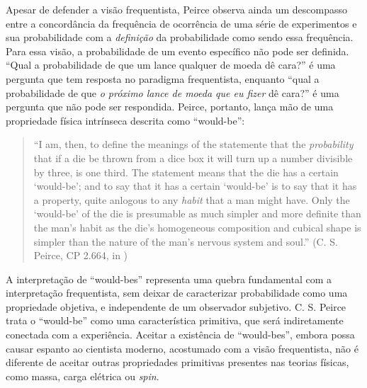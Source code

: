 Apesar de defender a visão frequentista, 
Peirce observa ainda um descompasso entre a concordância da frequência de ocorrência
de uma série de experimentos e sua probabilidade com a {\em definição} da probabilidade como sendo essa frequência. Para
essa visão, a probabilidade de um evento específico não pode ser definida. ``Qual a probabilidade de que um lance qualquer
de moeda dê cara?'' é uma pergunta que tem resposta no paradigma frequentista, enquanto ``qual a probabilidade de que 
{\em o próximo lance de moeda que eu fizer} dê cara?'' é uma pergunta que não pode ser respondida. Peirce, portanto, lança
mão de uma propriedade física intrínseca descrita como ``would-be'':

\begin{quote}
``I am, then, to define the meanings of the statemente that the {\em probability} that if a die be thrown from a dice
box it will turn up a number divisible by three, is one third. The statement means that the die has a certain `would-be';
and to say that it has a certain `would-be' is to say that it has a property, quite anlogous to any {\em habit} that a man
might have. Only the `would-be' of the die is presumable as much simpler and more definite than the man's habit as the
die's homogeneous composition and cubical shape is simpler than the nature of the man's nervous system and soul.''
(C. S. Peirce, CP 2.664, in \citep{Fetzer93})
\end{quote}

A interpretação de ``would-bes'' representa uma quebra fundamental com a interpretação frequentista, sem deixar de caracterizar
probabilidade como uma propriedade objetiva, e independente de um observador subjetivo. C. S. Peirce trata o ``would-be'' como
uma característica primitiva, que será indiretamente conectada com a experiência. Aceitar a existência de ``would-bes'', 
embora possa causar espanto ao cientista moderno, acostumado com a visão 
frequentista, não é diferente de aceitar outras propriedades
primitivas presentes nas teorias físicas, como massa, carga elétrica
ou {\em spin}.

